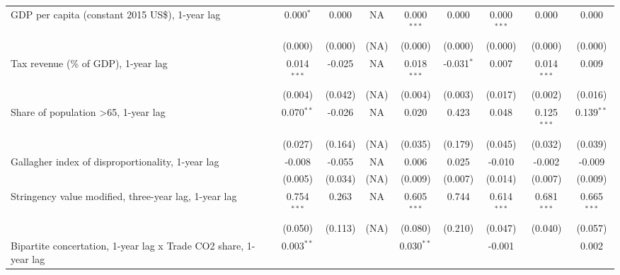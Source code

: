 \begin{table}[htbp]
\begin{tabular}{lcccccccc}
      GDP per capita (constant 2015 US\$), 1-year lag                  & 0.000$^{*}$   & 0.000                     & NA           & 0.000$^{***}$  & 0.000            & 0.000$^{***}$   & 0.000           & 0.000\\   
                                                                       & (0.000)       & (0.000)                   & (NA)         & (0.000)        & (0.000)          & (0.000)         & (0.000)         & (0.000)\\   
      Tax revenue (\% of GDP), 1-year lag                              & 0.014$^{***}$ & -0.025                    & NA           & 0.018$^{***}$  & -0.031$^{*}$     & 0.007           & 0.014$^{***}$   & 0.009\\   
                                                                       & (0.004)       & (0.042)                   & (NA)         & (0.004)        & (0.003)          & (0.017)         & (0.002)         & (0.016)\\   
      Share of population >65, 1-year lag                              & 0.070$^{**}$  & -0.026                    & NA           & 0.020          & 0.423            & 0.048           & 0.125$^{***}$   & 0.139$^{**}$\\   
                                                                       & (0.027)       & (0.164)                   & (NA)         & (0.035)        & (0.179)          & (0.045)         & (0.032)         & (0.039)\\   
      Gallagher index of disproportionality, 1-year lag                & -0.008        & -0.055                    & NA           & 0.006          & 0.025            & -0.010          & -0.002          & -0.009\\   
                                                                       & (0.005)       & (0.034)                   & (NA)         & (0.009)        & (0.007)          & (0.014)         & (0.007)         & (0.009)\\   
      Stringency value modified, three-year lag, 1-year lag            & 0.754$^{***}$ & 0.263                     & NA           & 0.605$^{***}$  & 0.744            & 0.614$^{***}$   & 0.681$^{***}$   & 0.665$^{***}$\\   
                                                                       & (0.050)       & (0.113)                   & (NA)         & (0.080)        & (0.210)          & (0.047)         & (0.040)         & (0.057)\\   
      Bipartite concertation, 1-year lag x Trade CO2 share, 1-year lag & 0.003$^{**}$  &                           &              & 0.030$^{**}$   &                  & -0.001          &                 & 0.002\\   

\end{tabular}
\end{table}
